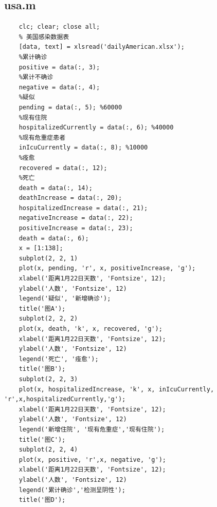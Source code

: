 \documentclass[UTF8]{ctexart}
\begin{document}
\subsection{usa.m}
\begin{lstlisting}
    clc; clear; close all;
    % 美国感染数据表
    [data, text] = xlsread('dailyAmerican.xlsx');
    %累计确诊
    positive = data(:, 3);
    %累计不确诊
    negative = data(:, 4);
    %疑似
    pending = data(:, 5); %60000
    %现有住院
    hospitalizedCurrently = data(:, 6); %40000
    %现有危重症患者
    inIcuCurrently = data(:, 8); %10000
    %痊愈
    recovered = data(:, 12);
    %死亡
    death = data(:, 14);
    deathIncrease = data(:, 20);
    hospitalizedIncrease = data(:, 21);
    negativeIncrease = data(:, 22);
    positiveIncrease = data(:, 23);
    death = data(:, 6);
    x = [1:138];
    subplot(2, 2, 1)
    plot(x, pending, 'r', x, positiveIncrease, 'g');
    xlabel('距离1月22日天数', 'Fontsize', 12);
    ylabel('人数', 'Fontsize', 12)
    legend('疑似', '新增确诊');
    title('图A');
    subplot(2, 2, 2)
    plot(x, death, 'k', x, recovered, 'g');
    xlabel('距离1月22日天数', 'Fontsize', 12);
    ylabel('人数', 'Fontsize', 12)
    legend('死亡', '痊愈');
    title('图B');
    subplot(2, 2, 3)
    plot(x, hospitalizedIncrease, 'k', x, inIcuCurrently, 'r',x,hospitalizedCurrently,'g');
    xlabel('距离1月22日天数', 'Fontsize', 12);
    ylabel('人数', 'Fontsize', 12)
    legend('新增住院', '现有危重症','现有住院');
    title('图C');
    subplot(2, 2, 4)
    plot(x, positive, 'r',x, negative, 'g');
    xlabel('距离1月22日天数', 'Fontsize', 12);
    ylabel('人数', 'Fontsize', 12)
    legend('累计确诊','检测呈阴性');
    title('图D');    
\end{lstlisting}
\newpage
\end{document}
